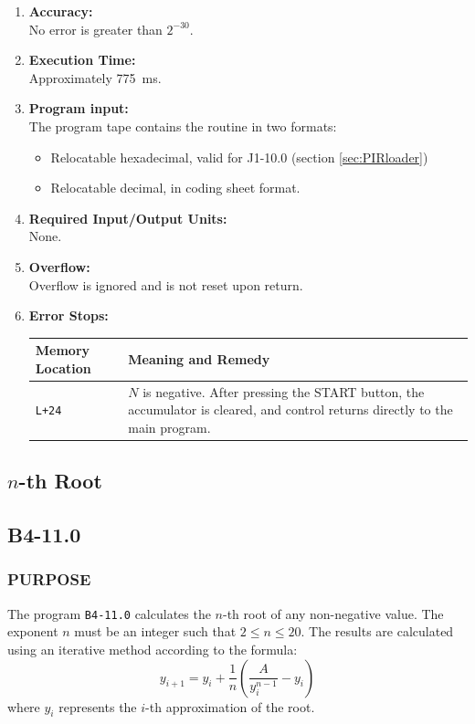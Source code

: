 \documentclass{article}
\begin{document}
\begin{enumerate}[leftmargin=1.5em, itemsep=6pt]
    \item \textbf{Accuracy:} \\
    No error is greater than $2^{-30}$.

    \item \textbf{Execution Time:} \\
    Approximately 775~ms.

    \item \textbf{Program input:} \\
    The program tape contains the routine in two formats:
    \begin{itemize}
      \item Relocatable hexadecimal, valid for J1-10.0 (section \ref{sec:PIRloader})
        \item Relocatable decimal, in coding sheet format.
    \end{itemize}

    \item \textbf{Required Input/Output Units:} \\
    None.

    \item \textbf{Overflow:} \\
    Overflow is ignored and is not reset upon return.

    \item \textbf{Error Stops:} \\
    \begin{tabular}{lp{9cm}}
        \toprule
        \textbf{Memory Location} & \textbf{Meaning and Remedy} \\
        \midrule
        \texttt{L+24}            & $N$ is negative. After pressing the \textsf{START} button, the accumulator is cleared, and control returns directly to the main program. \\
        \bottomrule
    \end{tabular}
\end{enumerate}
\newpage
\subsection{$n$-th Root}
\label{sec:nth_root}

\subsection*{B4-11.0}

\subsubsection*{PURPOSE}
The program \texttt{B4-11.0} calculates the $n$-th root of any non-negative value. The exponent $n$ must be an integer such that $2 \le n \le 20$. The results are calculated using an iterative method according to the formula:
\begin{equation}
    y_{i+1} = y_i + \frac{1}{n} \left( \frac{A}{y_i^{n-1}} - y_i \right)
\end{equation}
where $y_i$ represents the $i$-th approximation of the root.
\end{document}
